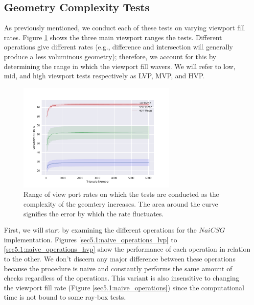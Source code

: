 \documentclass[a4paper,11pt,oneside]{article}
\begin{document}
\subsection{Geometry Complexity Tests}

As previously mentioned, we conduct each of these tests on varying viewport fill rates. Figure \ref{sec5.1:viewport_range} shows the three main viewport ranges the tests. Different operations give different rates (e.g., difference and intersection will generally produce a less voluminous geometry); therefore, we account for this by determining the range in which the viewport fill wavers. We will refer to low, mid, and high viewport tests respectively as LVP, MVP, and HVP.

\begin{figure}[H] 
	\begin{center}
		\includegraphics[width=0.7\textwidth]{section5/plots/view_port_final.png}
	\end{center}
	\caption{Range of view port rates on which the tests are conducted as the complexity of the geomtery increases. The area around the curve signifies the error by which the rate fluctuates.}
	\label{sec5.1:viewport_range}
\end{figure}


First, we will start by examining the different operations for the $NaiCSG$ implementation. Figures \ref{sec5.1:naive_operations_lvp} to \ref{sec5.1:naive_operations_hvp} show the performance of each operation in relation to the other. We don't discern any major difference between these operations because the procedure is naive and constantly performs the same amount of checks regardless of the operations. This variant is also insensitive to changing the viewport fill rate (Figure \ref{sec5.1:naive_operations}) since the computational time is not bound to some ray-box tests.
\end{document}

